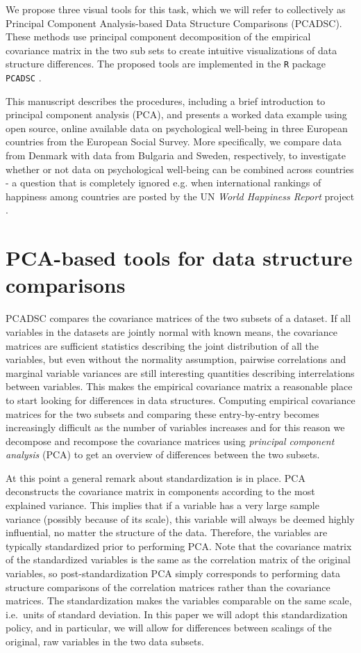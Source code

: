 \documentclass[a4paper,14pt]{article}
\begin{document}
We propose three visual tools for this task, which we will refer to collectively as Principal Component Analysis-based Data Structure Comparisons (PCADSC). These methods use principal component decomposition of the empirical covariance matrix in the two sub sets to create intuitive visualizations of data structure differences. The proposed tools are implemented in the \texttt{R} package \texttt{PCADSC} \cite{PCADSC}.

This manuscript describes the procedures, including a brief introduction to principal component analysis (PCA), and presents a worked data example using open source, online available data on psychological well-being in three European countries from the European Social Survey. More specifically, we compare data from Denmark with data from Bulgaria and Sweden, respectively, to investigate whether or not data on psychological well-being can be combined across countries - a question that is completely ignored e.g. when international rankings of happiness among countries are posted by the UN \textit{World Happiness Report} project \cite{WHR2016}.


\section*{PCA-based tools for data structure comparisons}\label{sec:pcadscintro}


PCADSC compares the covariance matrices of the two subsets of a dataset. If all variables in the datasets are jointly normal with known means, the covariance matrices are sufficient statistics describing the joint distribution of all the variables, but even without the normality assumption, pairwise correlations and marginal variable variances are still interesting quantities describing interrelations between variables. This makes the empirical covariance matrix a reasonable place to start looking for differences in data structures. Computing empirical covariance matrices for the two subsets and comparing these entry-by-entry becomes increasingly difficult as the number of variables increases and for this reason we decompose and recompose the covariance matrices using \textit{principal component analysis} (PCA) to get an overview of differences between the two subsets.

At this point a general remark about standardization is in place. PCA deconstructs the covariance matrix in components according to the most explained variance. This implies that if a variable has a very large sample variance (possibly because of its scale), this variable will always be deemed highly influential, no matter the structure of the data. Therefore, the variables are typically standardized prior to performing PCA. Note that the covariance matrix of the standardized variables is the same as the correlation matrix of the original variables, so post-standardization PCA simply corresponds to performing data structure comparisons of the correlation matrices rather than the covariance matrices. The standardization makes the variables comparable on the same scale, i.e.\ units of standard deviation. In this paper we will adopt this standardization policy, and in particular, we will allow for differences between scalings of the original, raw variables in the two data subsets.
\end{document}

